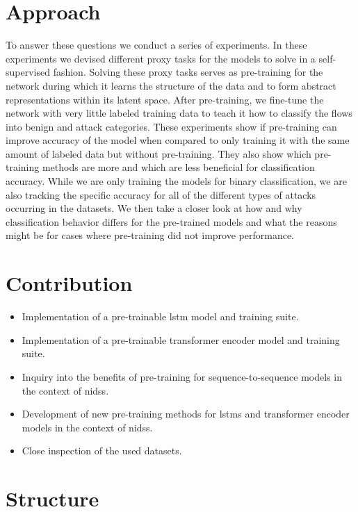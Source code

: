 \section{Approach} \label{sect.approach}

To answer these questions we conduct a series of experiments. In these experiments we devised different proxy tasks for the models to solve in a self-supervised fashion. Solving these proxy tasks serves as pre-training for the network during which it learns the structure of the data and to form abstract representations within its latent space. After pre-training, we fine-tune the network with very little labeled training data to teach it how to classify the flows into benign and attack categories. These experiments show if pre-training can improve accuracy of the model when compared to only training it with the same amount of labeled data but without pre-training. They also show which pre-training methods are more and which are less beneficial for classification accuracy. 
While we are only training the models for binary classification, we are also tracking the specific accuracy for all of the different types of attacks occurring in the datasets. We then take a closer look at how and why classification behavior differs for the pre-trained models and what the reasons might be for cases where pre-training did not improve performance.

\section{Contribution} \label{sect.contribution}

\begin{itemize}
	\item Implementation of a pre-trainable \gls{lstm} model and training suite.
	\item Implementation of a pre-trainable transformer encoder model and training suite.
	\item Inquiry into the benefits of pre-training for sequence-to-sequence models in the context of \glspl{nids}.
	\item Development of new pre-training methods for \glspl{lstm} and transformer encoder models in the context of \glspl{nids}.
	\item Close inspection of the used datasets.
\end{itemize}

\section{Structure} \label{sect.structure}

